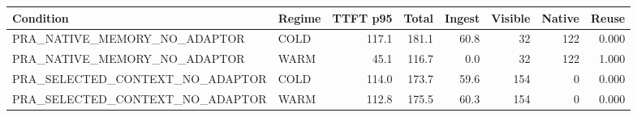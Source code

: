 \begin{tabular}{llrrrrrr}
\toprule
Condition & Regime & TTFT p95 & Total & Ingest & Visible & Native & Reuse \\
\midrule
PRA\_NATIVE\_MEMORY\_NO\_ADAPTOR & COLD & 117.1 & 181.1 & 60.8 & 32 & 122 & 0.000 \\
PRA\_NATIVE\_MEMORY\_NO\_ADAPTOR & WARM & 45.1 & 116.7 & 0.0 & 32 & 122 & 1.000 \\
PRA\_SELECTED\_CONTEXT\_NO\_ADAPTOR & COLD & 114.0 & 173.7 & 59.6 & 154 & 0 & 0.000 \\
PRA\_SELECTED\_CONTEXT\_NO\_ADAPTOR & WARM & 112.8 & 175.5 & 60.3 & 154 & 0 & 0.000 \\
\bottomrule
\end{tabular}
